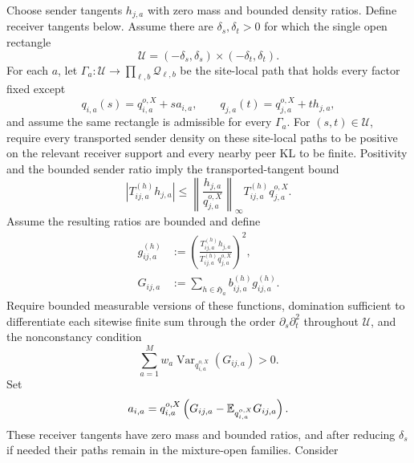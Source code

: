 Choose sender tangents \(h_{j,a}\) with zero mass and bounded density ratios. Define receiver tangents below. Assume there are \(\delta_s,\delta_t>0\) for which the single open rectangle
\begin{equation}
\mathcal U=(-\delta_s,\delta_s)\times(-\delta_t,\delta_t).
\label{eq:moving-peer-admissible-rectangle}
\end{equation}
For each \(a\), let \(\Gamma_a:\mathcal U\to\prod_{\ell,b}\mathcal Q_{\ell,b}\) be the site-local path that holds every factor fixed except
\begin{equation}
q_{i,a}(s)=q_{i,a}^{o,X}+s a_{i,a},
\qquad
q_{j,a}(t)=q_{j,a}^{o,X}+t h_{j,a},
\label{eq:moving-peer-finite-paths}
\end{equation}
and assume the same rectangle is admissible for every \(\Gamma_a\). For \((s,t)\in\mathcal U\), require every transported sender density on these site-local paths to be positive on the relevant receiver support and every nearby peer KL to be finite. Positivity and the bounded sender ratio imply the transported-tangent bound
\begin{equation}
\left|T_{ij,a}^{(h)}h_{j,a}\right|
\leq
\left\lVert\frac{h_{j,a}}{q_{j,a}^{o,X}}\right\rVert_\infty
T_{ij,a}^{(h)}q_{j,a}^{o,X}.
\label{eq:moving-peer-transported-tangent-bound}
\end{equation}
Assume the resulting ratios are bounded and define
\begin{align}
g_{ij,a}^{(h)}
&:=\left(
\frac{T_{ij,a}^{(h)}h_{j,a}}
{T_{ij,a}^{(h)}q_{j,a}^{o,X}}
\right)^2,
\label{eq:moving-peer-g-definition}\\
G_{ij,a}
&:=\sum_{h\in\mathfrak H_a}b_{ij,a}^{(h)}g_{ij,a}^{(h)}.
\label{eq:moving-peer-aggregate-definition}
\end{align}
Require bounded measurable versions of these functions, domination sufficient to differentiate each sitewise finite sum through the order \(\partial_s\partial_t^2\) throughout \(\mathcal U\), and the nonconstancy condition
\begin{equation}
\sum_{a=1}^{M}w_a
\operatorname{Var}_{q_{i,a}^{o,X}}(G_{ij,a})>0.
\label{eq:moving-peer-finite-positive-variance}
\end{equation}
Set
\begin{equation}
a_{i,a}=q_{i,a}^{o,X}
\left(G_{ij,a}-\mathbb E_{q_{i,a}^{o,X}}G_{ij,a}\right).
\label{eq:moving-peer-receiver-tangent}
\end{equation}
These receiver tangents have zero mass and bounded ratios, and after reducing \(\delta_s\) if needed their paths remain in the mixture-open families. Consider
